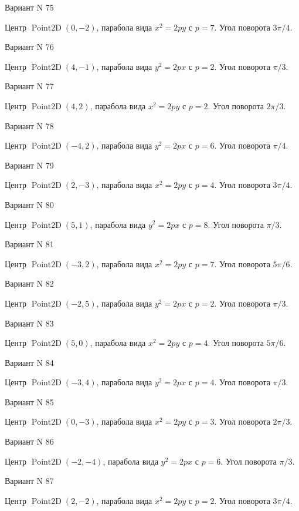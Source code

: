 \documentclass[11pt]{report}
\begin{document}
Вариант N 75

Центр $\operatorname{Point2D}\left(0, -2\right)$, парабола вида $x^{2} = 2py$ с $p = 7$. Угол поворота $3 \pi / 4$.

Вариант N 76

Центр $\operatorname{Point2D}\left(4, -1\right)$, парабола вида $y^{2} = 2px$ с $p = 2$. Угол поворота $\pi / 3$.

Вариант N 77

Центр $\operatorname{Point2D}\left(4, 2\right)$, парабола вида $x^{2} = 2py$ с $p = 2$. Угол поворота $2 \pi / 3$.

Вариант N 78

Центр $\operatorname{Point2D}\left(-4, 2\right)$, парабола вида $y^{2} = 2px$ с $p = 6$. Угол поворота $\pi / 4$.

Вариант N 79

Центр $\operatorname{Point2D}\left(2, -3\right)$, парабола вида $x^{2} = 2py$ с $p = 4$. Угол поворота $3 \pi / 4$.

Вариант N 80

Центр $\operatorname{Point2D}\left(5, 1\right)$, парабола вида $y^{2} = 2px$ с $p = 8$. Угол поворота $\pi / 3$.

Вариант N 81

Центр $\operatorname{Point2D}\left(-3, 2\right)$, парабола вида $x^{2} = 2py$ с $p = 7$. Угол поворота $5 \pi / 6$.

Вариант N 82

Центр $\operatorname{Point2D}\left(-2, 5\right)$, парабола вида $y^{2} = 2px$ с $p = 2$. Угол поворота $\pi / 3$.

Вариант N 83

Центр $\operatorname{Point2D}\left(5, 0\right)$, парабола вида $x^{2} = 2py$ с $p = 4$. Угол поворота $5 \pi / 6$.

Вариант N 84

Центр $\operatorname{Point2D}\left(-3, 4\right)$, парабола вида $y^{2} = 2px$ с $p = 4$. Угол поворота $\pi / 3$.

Вариант N 85

Центр $\operatorname{Point2D}\left(0, -3\right)$, парабола вида $x^{2} = 2py$ с $p = 3$. Угол поворота $2 \pi / 3$.

Вариант N 86

Центр $\operatorname{Point2D}\left(-2, -4\right)$, парабола вида $y^{2} = 2px$ с $p = 6$. Угол поворота $\pi / 3$.

Вариант N 87

Центр $\operatorname{Point2D}\left(2, -2\right)$, парабола вида $x^{2} = 2py$ с $p = 2$. Угол поворота $3 \pi / 4$.
\end{document}
